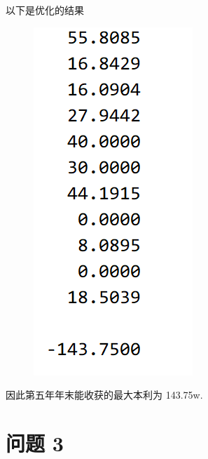 \documentclass[11pt]{ctexart}
\begin{document}
    以下是优化的结果
    \begin{figure}[H]
        \centering
        \includegraphics[]{picture/exp2}
    \end{figure}

    因此第五年年末能收获的最大本利为 143.75w.

    \clearpage


    \section{问题 3}
\end{document}
